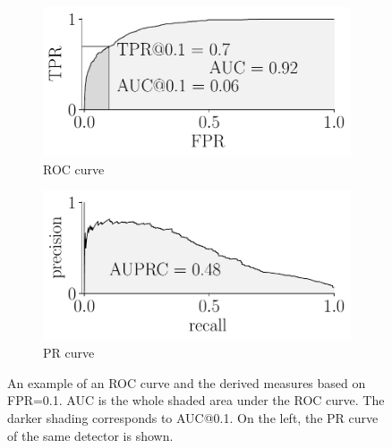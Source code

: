 \begin{figure}
\centering
\begin{subfigure}[b]{0.45\textwidth} 
	\centering
	\includegraphics[width=\textwidth]{data/chapter_intro/roc_example.pdf}
	\caption{ROC curve}
	\label{fig:roc_example}
\end{subfigure}
\hfill
\begin{subfigure}[b]{0.45\textwidth}
	\centering
	\includegraphics[width=\textwidth]{data/chapter_intro/prc_example.pdf}
	\caption{PR curve}
	 \label{fig:prc_example}
\end{subfigure}
\caption{An example of an ROC curve and the derived measures based on FPR=0.1. AUC is the whole shaded area under the ROC curve. The darker shading corresponds to AUC@0.1. On the left, the PR curve of the same detector is shown.}
\label{fig:ROC}
\end{figure}

